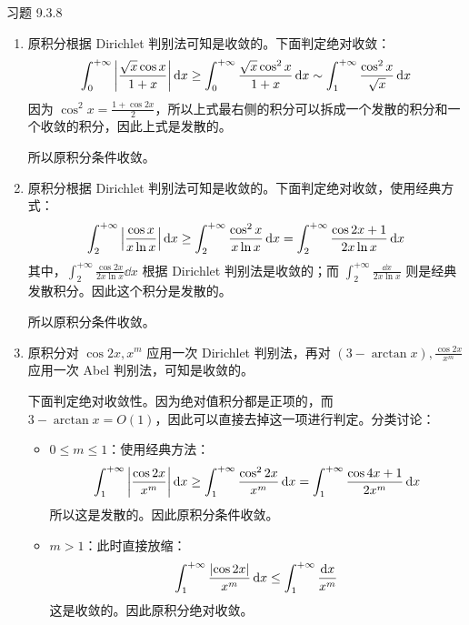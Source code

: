 \begin{problem}
	习题 9.3.8
	\begin{solution}
		\begin{enumerate}
			\item[\textbf{1)}] 原积分根据 Dirichlet 判别法可知是收敛的。下面判定绝对收敛：
			$$
			\int_{0}^{+ \infty} \abs{\frac{\sqrt{x} \cos x}{1 + x}} \dd{x} \ge \int_{0}^{+\infty} \frac{\sqrt{x} \cos^2 x}{1 + x} \dd{x} \sim \int_{1}^{+\infty} \frac{\cos^2 x}{\sqrt{x}} \dd{x}
			$$
			因为 $\cos^2 x = \frac{1 + \cos 2x}{2}$，所以上式最右侧的积分可以拆成一个发散的积分和一个收敛的积分，因此上式是发散的。

			所以原积分条件收敛。

			\item[\textbf{3)}] 原积分根据 Dirichlet 判别法可知是收敛的。下面判定绝对收敛，使用经典方式：
			$$
			\int_{2}^{+ \infty} \abs{\frac{\cos x}{x \ln x}} \dd{x} \ge \int_{2}^{+\infty} \frac{\cos^2 x}{x \ln x} \dd{x} = \int_{2}^{+\infty} \frac{\cos 2x + 1}{2 x \ln x} \dd{x}
			$$
			其中，$\displaystyle \int_{2}^{+\infty} \frac{\cos 2x}{2x \ln x} \dd{x}$ 根据 Dirichlet 判别法是收敛的；而 $\displaystyle \int_{2}^{+\infty} \frac{\dd{x}}{2 x \ln x}$ 则是经典发散积分。因此这个积分是发散的。

			所以原积分条件收敛。

			\item[\textbf{4)}] 原积分对 $\cos 2x, x^{m}$ 应用一次 Dirichlet 判别法，再对 $(3 - \arctan x), \frac{\cos 2x}{x^{m}}$ 应用一次 Abel 判别法，可知是收敛的。

			下面判定绝对收敛性。因为绝对值积分都是正项的，而 $3 - \arctan x = O(1)$，因此可以直接去掉这一项进行判定。分类讨论：
			\begin{itemize}
				\item $0 \le m \le 1$：使用经典方法：
				$$
				\int_{1}^{+\infty} \abs{\frac{\cos 2x}{x^{m}}} \dd{x} \ge \int_{1}^{+\infty} \frac{\cos^2 2x}{x^{m}} \dd{x} = \int_{1}^{+\infty} \frac{\cos 4x + 1}{2 x^{m}} \dd{x}
				$$
				所以这是发散的。因此原积分条件收敛。

				\item $m > 1$：此时直接放缩：
				$$
				\int_{1}^{+\infty} \frac{\abs{\cos 2x}}{x^{m}} \dd{x} \le \int_{1}^{+ \infty} \frac{\dd{x}}{x^{m}}
				$$
				这是收敛的。因此原积分绝对收敛。
			\end{itemize}
		\end{enumerate}
	\end{solution}
\end{problem}

